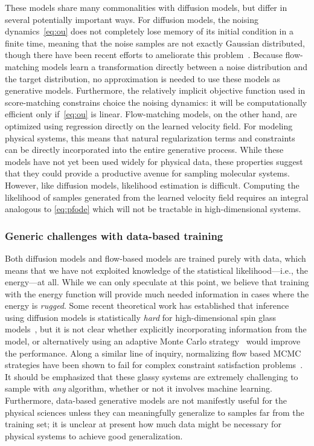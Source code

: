 \documentclass[11pt]{article}
\begin{document}
These models share many commonalities with diffusion models, but differ in several potentially important ways.
For diffusion models, the noising dynamics~\eqref{eq:ou} does not completely lose memory of its initial condition in a finite time, meaning that the noise samples are not exactly Gaussian distributed, though there have been recent efforts to ameliorate this problem~\cite{shi_diffusion_2023}.
Because flow-matching models learn a transformation directly between a noise distribution and the target distribution, no approximation is needed to use these models as generative models. 
Furthermore, the relatively implicit objective function used in score-matching constrains choice the noising dynamics: it will be computationally efficient only if~\eqref{eq:ou} is linear.
Flow-matching models, on the other hand, are optimized using regression directly on the learned velocity field. 
For modeling physical systems, this means that natural regularization terms and constraints can be directly incorporated into the entire generative process. 
While these models have not yet been used widely for physical data, these properties suggest that they could provide a productive avenue for sampling molecular systems. 
However, like diffusion models, likelihood estimation is difficult. 
Computing the likelihood of samples generated from the learned velocity field requires an integral analogous to \eqref{eq:pfode} which will not be tractable in high-dimensional systems.


\subsubsection{Generic challenges with data-based training}

Both diffusion models and flow-based models are trained purely with data, which means that we have not exploited knowledge of the statistical likelihood---i.e., the energy---at all. 
While we can only speculate at this point, we believe that training with the energy function will provide much needed information in cases where the energy is \emph{rugged}.
Some recent theoretical work has established that inference using diffusion models is statistically \emph{hard} for high-dimensional spin glass models~\cite{ghio_sampling_2023}, but it is not clear whether explicitly incorporating information from the model, or alternatively using an adaptive Monte Carlo strategy~\cite{gabrie_efficient_2021, gabrie_adaptive_2022} would improve the performance.
Along a similar line of inquiry, normalizing flow based MCMC strategies have been shown to fail for complex constraint satisfaction problems~\cite{ciarella_machine-learning-assisted_2023}.
It should be emphasized that these glassy systems are extremely challenging to sample with \emph{any} algorithm, whether or not it involves machine learning.
Furthermore, data-based generative models are not manifestly useful for the physical sciences unless they can meaningfully generalize to samples far from the training set; it is unclear at present how much data might be necessary for physical systems to achieve good generalization.
\end{document}
